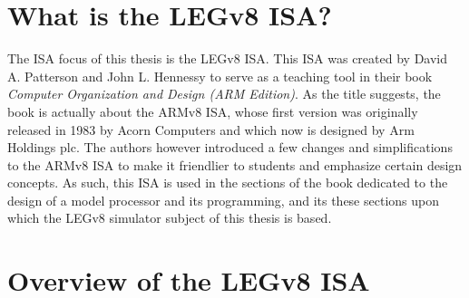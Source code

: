 \section*{What is the LEGv8 ISA?}

The ISA focus of this thesis is the LEGv8 ISA. This ISA was created by David A. Patterson and John L. Hennessy to serve as a teaching
tool in their book \emph{Computer Organization and Design (ARM Edition)}. As the title suggests, the book is actually about the ARMv8 ISA, whose first
version was originally released in 1983 by Acorn Computers and which now is designed by Arm Holdings plc. The authors however introduced a few
changes and simplifications to the ARMv8 ISA to make it friendlier to students and emphasize certain design concepts. As such, this ISA is used
in the sections of the book dedicated to the design of a model processor and its programming, and its these sections upon which the LEGv8 simulator
subject of this thesis is based.

\section*{Overview of the LEGv8 ISA}
